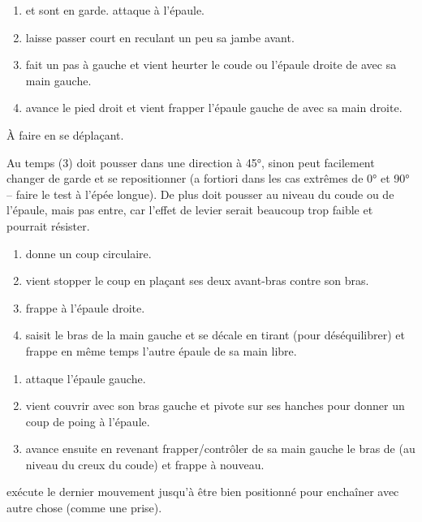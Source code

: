 \begin{exercice}

	\begin{enumerate}
		\item \A et \D sont en garde.
		\A attaque \D à l'épaule.
		
		\item \D laisse passer court en reculant un peu sa jambe avant.
		
		\item \D fait un pas à gauche et vient heurter le coude ou l'épaule droite de \A avec sa main gauche.
		
		\item \D avance le pied droit et vient frapper l'épaule gauche de \A avec sa main droite.
	\end{enumerate}

	À faire en se déplaçant.

	Au temps (3) \D doit pousser dans une direction à 45°, sinon \A peut facilement changer de garde et se repositionner (a fortiori dans les cas extrêmes de \ang{0} et \ang{90} -- faire le test à l'épée longue).
	De plus \D doit pousser au niveau du coude ou de l'épaule, mais pas entre, car l'effet de levier serait beaucoup trop faible et \A pourrait résister.

\end{exercice}


\begin{exercice}

	\begin{enumerate}
		\item \A donne un coup circulaire.
		
		\item \D vient stopper le coup en plaçant ses deux avant-bras contre son bras.
		
		\item \D frappe à l'épaule droite.
		
		\item \D saisit le bras de la main gauche et se décale en tirant (pour déséquilibrer) et frappe en même temps l'autre épaule de sa main libre.
	\end{enumerate}
\end{exercice}


\begin{technique}
	\begin{enumerate}
		\item \A attaque l'épaule gauche.
		
		\item \D vient couvrir avec son bras gauche et pivote sur ses hanches pour donner un coup de poing à l'épaule.
		
		\item \D avance ensuite en revenant frapper/contrôler de sa main gauche le bras de \A (au niveau du creux du coude) et frappe à nouveau.
	\end{enumerate}

	\D exécute le dernier mouvement jusqu'à être bien positionné pour enchaîner avec autre chose (comme une prise).
\end{technique}



